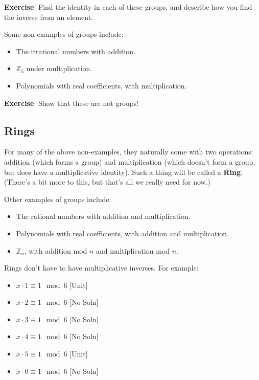 \documentclass[11pt]{article}
\theoremstyle{definition}
\numberwithin{thm}{section}
\begin{document}
\textbf{Exercise}. Find the identity in each of these groups, and describe how you find the inverse from an element.

Some non-examples of groups include:
\begin{itemize}
	\item The irrational numbers with addition.
    \item $\mathbb{Z}_5$ under multiplication.
    \item Polynomials with real coefficients, with multiplication.
\end{itemize}

\textbf{Exercise}. Show that these are not groups!

\subsection{Rings}

For many of the above non-examples, they naturally come with two operations: addition (which forms a group) and multiplication (which doesn't form a group, but does have a multiplicative identity). Such a thing will be called a \textbf{Ring}. (There's a bit more to this, but that's all we really need for now.)

Other examples of groups include:
\begin{itemize}
	\item The rational numbers with addition and multiplication.
    \item Polynomials with real coefficients, with addition and multiplication. 
    \item $\mathbb{Z}_n$, with addition mod $n$ and multiplication mod $n$.
\end{itemize}

Rings don't have to have multiplicative inverses. For example:

\begin{itemize}
	\item $x \cdot 1 \equiv 1 \mod 6$ [Unit]
    \item $x \cdot 2 \equiv 1 \mod 6$ [No Soln]
    \item $x \cdot 3 \equiv 1 \mod 6$ [No Soln]
    \item $x \cdot 4 \equiv 1 \mod 6$ [No Soln]
    \item $x \cdot 5 \equiv 1 \mod 6$ [Unit]
    \item $x \cdot 0 \equiv 1 \mod 6$ [No Soln]
\end{itemize}
\end{document}
